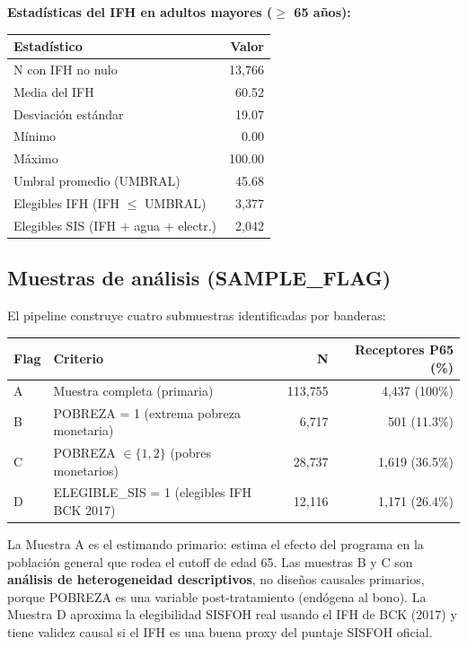 \documentclass[12pt, a4paper]{article}
\begin{document}
\textbf{Estadísticas del IFH en adultos mayores ($\geq$ 65 años):}
\begin{center}
\begin{tabular}{lr}
\toprule
Estadístico & Valor \\\midrule
N con IFH no nulo & 13{,}766 \\
Media del IFH & 60.52 \\
Desviación estándar & 19.07 \\
Mínimo & 0.00 \\
Máximo & 100.00 \\
Umbral promedio (UMBRAL) & 45.68 \\
Elegibles IFH (IFH $\leq$ UMBRAL) & 3{,}377 \\
Elegibles SIS (IFH + agua + electr.) & 2{,}042 \\
\bottomrule
\end{tabular}
\end{center}

\subsection{Muestras de análisis (SAMPLE\_FLAG)}

El pipeline construye cuatro submuestras identificadas por banderas:

\begin{center}
\begin{tabular}{llrr}
\toprule
Flag & Criterio & N & Receptores P65 (\%) \\\midrule
A & Muestra completa (primaria) & 113{,}755 & 4{,}437 (100\%) \\
B & POBREZA = 1 (extrema pobreza monetaria) & 6{,}717 & 501 (11.3\%) \\
C & POBREZA $\in \{1, 2\}$ (pobres monetarios) & 28{,}737 & 1{,}619 (36.5\%) \\
D & ELEGIBLE\_SIS = 1 (elegibles IFH BCK 2017) & 12{,}116 & 1{,}171 (26.4\%) \\
\bottomrule
\end{tabular}
\end{center}

\begin{interpcaja}
La Muestra A es el estimando primario: estima el efecto del programa en la
población general que rodea el cutoff de edad 65. Las muestras B y C son
\textbf{análisis de heterogeneidad descriptivos}, no diseños causales
primarios, porque POBREZA es una variable post-tratamiento (endógena al
bono). La Muestra D aproxima la elegibilidad SISFOH real usando el IFH
de BCK (2017) y tiene validez causal si el IFH es una buena proxy del
puntaje SISFOH oficial.
\end{interpcaja}
\end{document}
